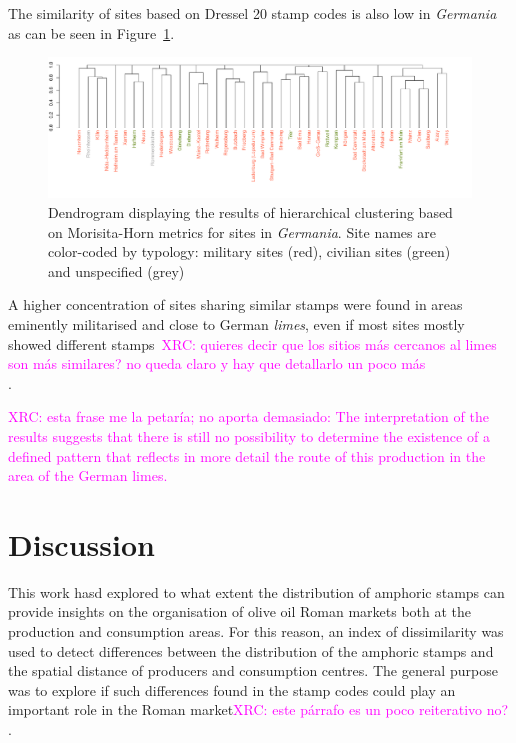 \documentclass[review]{elsarticle}
\newcommand{\memo}[2]{\textcolor{#1}{#2}}
\newcommand{\xavi}[1]{\memo{magenta}{XRC: #1\\}}
\begin{document}
The similarity of sites based on Dressel 20 stamp codes is also low in \textit{Germania} as can be seen in Figure~\ref{germap}.

\begin{figure}
	\centering
\includegraphics[angle=180, width=\linewidth]{figs/dendroger5.pdf}
\caption{Dendrogram displaying the results of hierarchical clustering based on Morisita-Horn metrics for sites in \textit{Germania}. Site names are color-coded by typology: military sites (red), civilian sites (green) and unspecified (grey)}
\label{germap}
\end{figure}

A higher concentration of sites sharing similar stamps were found in areas eminently militarised and close to German \textit{limes}, even if most sites mostly showed different stamps~\xavi{quieres decir que los sitios más cercanos al limes son más similares? no queda claro y hay que detallarlo un poco más}.

\xavi{esta frase me la petaría; no aporta demasiado: The interpretation of the results suggests that there is still no possibility to determine the existence of a defined pattern that reflects in more detail the route of this production in the area of the German limes.}


\section{Discussion}


This work hasd explored to what extent the distribution of amphoric stamps can provide insights on the organisation of olive oil Roman markets both at the production and consumption areas. For this reason, an index of dissimilarity was used to detect differences between the distribution of the amphoric stamps and the spatial distance of producers and consumption centres. The general purpose was to explore if such differences found in the stamp codes could play an important role in the Roman market\xavi{este párrafo es un poco reiterativo no?}.  
\end{document}

